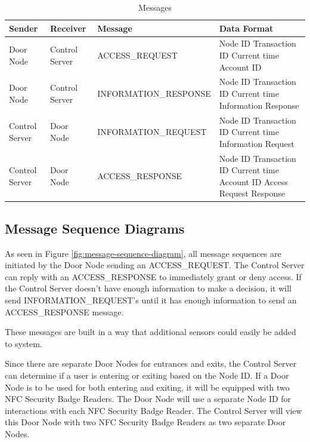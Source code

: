 \begin{table}[htb]
\begin{tabular}{ l | l | l | p{4.5cm} }
\toprule
Sender & Receiver & Message & Data Format\\
\midrule
Door Node & Control Server & ACCESS\_REQUEST &
Node ID \newline Transaction ID \newline Current time \newline Account ID\\
\hline
Door Node & Control Server & INFORMATION\_RESPONSE &
Node ID \newline Transaction ID \newline Current time \newline Information Response\\
\hline
Control Server & Door Node & INFORMATION\_REQUEST &
Node ID \newline Transaction ID \newline Current time \newline Information Request\\
\hline
Control Server & Door Node & ACCESS\_RESPONSE &
Node ID \newline Transaction ID \newline Current time \newline Account ID \newline Access Request Response\\
\bottomrule
\end{tabular}
\caption{Messages}
\end{table}

\subsection{Message Sequence Diagrams}

As seen in Figure \ref{fig:message-sequence-diagram}, all message sequences are
initiated by the Door Node sending an ACCESS\_REQUEST.  The Control Server can
reply with an ACCESS\_RESPONSE to immediately grant or deny access.  If the
Control Server doesn't have enough information to make a decision, it will send
INFORMATION\_REQUEST's until it has enough information to send an
ACCESS\_RESPONSE message.

These messages are built in a way that additional sensors could easily be added
to system.

Since there are separate Door Nodes for entrances and exits, the Control Server
can determine if a user is entering or exiting based on the Node ID.  If a Door
Node is to be used for both entering and exiting, it will be equipped with two
NFC Security Badge Readers.  The Door Node will use a separate Node ID for
interactions with each NFC Security Badge Reader.  The Control Server will view
this Door Node with two NFC Security Badge Readers as two separate Door Nodes.


